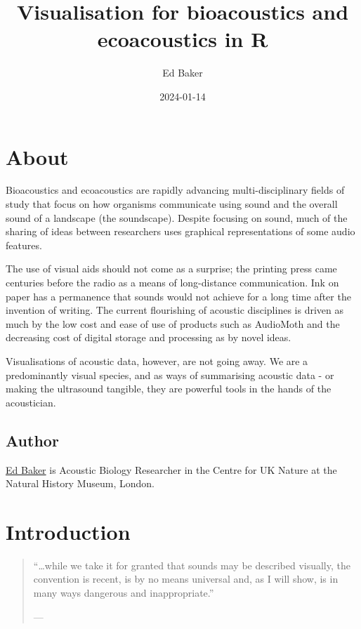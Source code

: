 \documentclass[
]{book}
\title{Visualisation for bioacoustics and ecoacoustics in R}
\author{Ed Baker}
\date{2024-01-14}
\begin{document}
\maketitle

{
\setcounter{tocdepth}{1}
\tableofcontents
}
\hypertarget{about}{%
\chapter*{About}\label{about}}

Bioacoustics and ecoacoustics are rapidly advancing multi-disciplinary fields of study that focus on how organisms communicate using sound and the overall sound of a landscape (the soundscape). Despite focusing on sound, much of the sharing of ideas between researchers uses graphical representations of some audio features.

The use of visual aids should not come as a surprise; the printing press came centuries before the radio as a means of long-distance communication. Ink on paper has a permanence that sounds would not achieve for a long time after the invention of writing. The current flourishing of acoustic disciplines is driven as much by the low cost and ease of use of products such as AudioMoth and the decreasing cost of digital storage and processing as by novel ideas.

Visualisations of acoustic data, however, are not going away. We are a predominantly visual species, and as ways of summarising acoustic data - or making the ultrasound tangible, they are powerful tools in the hands of the acoustician.

\hypertarget{author}{%
\section*{Author}\label{author}}

\href{https://ebaker.me.uk}{Ed Baker} is Acoustic Biology Researcher in the Centre for UK Nature at the Natural History Museum, London.

\hypertarget{intro}{%
\chapter{Introduction}\label{intro}}

\begin{quote}
``\ldots while we take it for granted that sounds may be described visually, the convention is recent, is by no means universal and, as I will show, is in many ways dangerous and inappropriate.''

\hfill --- \citet{schafer1977}
\end{quote}
\end{document}
